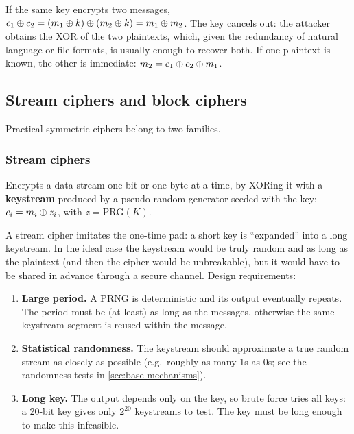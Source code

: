 \begin{remark}
If the same key encrypts two messages, $c_1 \oplus c_2 = (m_1 \oplus k) \oplus (m_2 \oplus k) = m_1 \oplus m_2$. The key cancels out: the attacker obtains the XOR of the two plaintexts, which, given the redundancy of natural language or file formats, is usually enough to recover both. If one plaintext is known, the other is immediate: $m_2 = c_1 \oplus c_2 \oplus m_1$.
\end{remark}

\subsection{Stream ciphers and block ciphers}

Practical symmetric ciphers belong to two families.

\subsubsection{Stream ciphers}

\begin{definition}
Encrypts a data stream one bit or one byte at a time, by XORing it with a \textbf{keystream} produced by a pseudo-random generator seeded with the key: $c_i = m_i \oplus z_i$, with $z = \mathrm{PRG}(K)$.
\end{definition}

A stream cipher imitates the one-time pad: a short key is \enquote{expanded} into a long keystream. In the ideal case the keystream would be truly random and as long as the plaintext (and then the cipher would be unbreakable), but it would have to be shared in advance through a secure channel. Design requirements:
\begin{enumerate}
    \item \textbf{Large period.} A PRNG is deterministic and its output eventually repeats. The period must be (at least) as long as the messages, otherwise the same keystream segment is reused within the message.
    \item \textbf{Statistical randomness.} The keystream should approximate a true random stream as closely as possible (e.g.\ roughly as many 1s as 0s; see the randomness tests in \cref{sec:base-mechanisms}).
    \item \textbf{Long key.} The output depends only on the key, so brute force tries all keys: a 20-bit key gives only $2^{20}$ keystreams to test. The key must be long enough to make this infeasible.
\end{enumerate}

